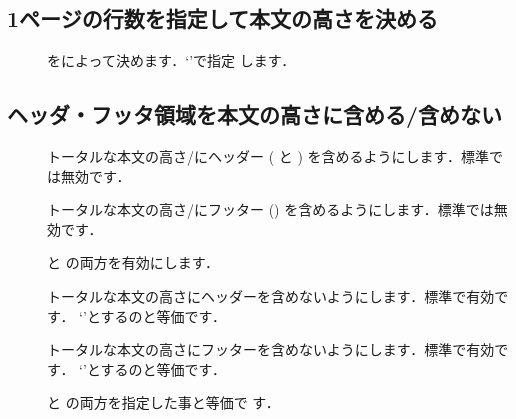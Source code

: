 \subsection{1ページの行数を指定して本文の高さを決める}

\begin{usage}
\usepackage{geometry}
\geometry{lines=$\<行数>$} 
\end{usage}

\begin{description}
 \item[]
   をによって決めます．`'で指定
  します．
\end{description}

\subsection{ヘッダ・フッタ領域を本文の高さに含める/含めない}

\begin{description}
 \item[]
  トータルな本文の高さ/にヘッダー
  ( と ) を含めるようにします．標準では無効です．
 \item[]
  トータルな本文の高さ/にフッター
  () を含めるようにします．標準では無効です．
 \item[]
   と  の両方を有効にします．
\end{description}

\begin{description}
 \item[]
  トータルな本文の高さにヘッダーを含めないようにします．標準で有効です．
  `'とするのと等価です．
 \item[]
  トータルな本文の高さにフッターを含めないようにします．標準で有効です．
  `'とするのと等価です．
 \item[]
   と  の両方を指定した事と等価で
  す．
\end{description}

